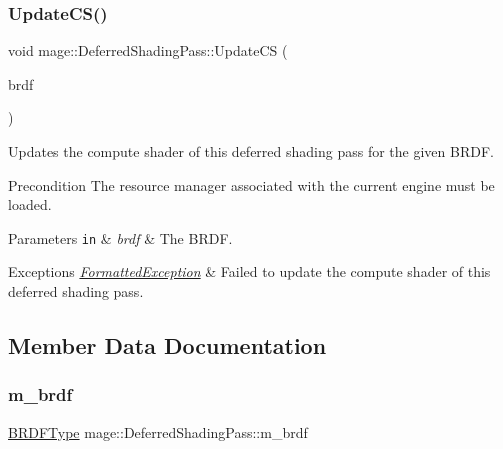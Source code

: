 \subsubsection{\texorpdfstring{Update\+C\+S()}{UpdateCS()}}
{\footnotesize\ttfamily void mage\+::\+Deferred\+Shading\+Pass\+::\+Update\+CS (\begin{DoxyParamCaption}\item[{\hyperlink{namespacemage_ae7a7a03a7b34d7e2689689bb8295cd38}{B\+R\+D\+F\+Type}}]{brdf }\end{DoxyParamCaption})\hspace{0.3cm}{\ttfamily [private]}}

Updates the compute shader of this deferred shading pass for the given B\+R\+DF.

\begin{DoxyPrecond}{Precondition}
The resource manager associated with the current engine must be loaded. 
\end{DoxyPrecond}

\begin{DoxyParams}[1]{Parameters}
\mbox{\tt in}  & {\em brdf} & The B\+R\+DF. \\
\hline
\end{DoxyParams}

\begin{DoxyExceptions}{Exceptions}
{\em \hyperlink{structmage_1_1_formatted_exception}{Formatted\+Exception}} & Failed to update the compute shader of this deferred shading pass. \\
\hline
\end{DoxyExceptions}


\subsection{Member Data Documentation}
\hypertarget{classmage_1_1_deferred_shading_pass_a5a466f5c2ee71563f4f8ed6d042ee4b3}{}\label{classmage_1_1_deferred_shading_pass_a5a466f5c2ee71563f4f8ed6d042ee4b3} 
\subsubsection{\texorpdfstring{m\+\_\+brdf}{m\_brdf}}
{\footnotesize\ttfamily \hyperlink{namespacemage_ae7a7a03a7b34d7e2689689bb8295cd38}{B\+R\+D\+F\+Type} mage\+::\+Deferred\+Shading\+Pass\+::m\+\_\+brdf\hspace{0.3cm}{\ttfamily [private]}}

